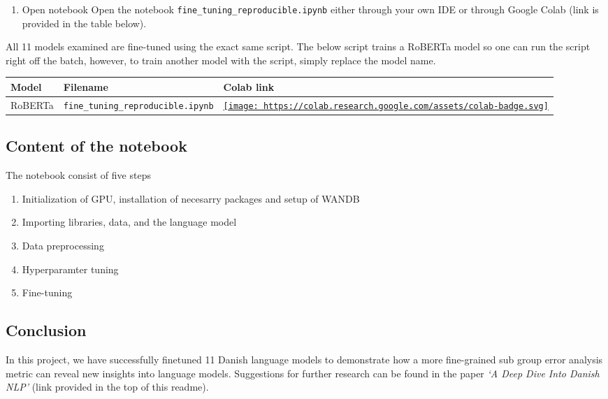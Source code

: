 \documentclass[
]{article}
\providecommand{\tightlist}{%
  \setlength{\itemsep}{0pt}\setlength{\parskip}{0pt}}
\begin{document}
\begin{enumerate}
\def\labelenumi{\arabic{enumi}.}
\setcounter{enumi}{1}
\tightlist
\item
  Open notebook Open the notebook
  \texttt{fine\_tuning\_reproducible.ipynb} either through your own IDE
  or through Google Colab (link is provided in the table below).
\end{enumerate}

All 11 models examined are fine-tuned using the exact same script. The
below script trains a RoBERTa model so one can run the script right off
the batch, however, to train another model with the script, simply
replace the model name.

\begin{longtable}[]{@{}lll@{}}
\toprule
Model & Filename & Colab link\tabularnewline
\midrule
\endhead
RoBERTa & \texttt{fine\_tuning\_reproducible.ipynb} &
\href{https://colab.research.google.com/drive/1I4GyXlebR7q1nbQ6uOR92cFyqCdDTgW2\#scrollTo=sR5zEsTidz5e}{\texttt{[image: https://colab.research.google.com/assets/colab-badge.svg]}}\tabularnewline
\bottomrule
\end{longtable}

\hypertarget{content-of-the-notebook}{%
\subsection{Content of the notebook}\label{content-of-the-notebook}}

The notebook consist of five steps

\begin{enumerate}
\def\labelenumi{\arabic{enumi}.}
\tightlist
\item
  Initialization of GPU, installation of necesarry packages and setup of
  WANDB
\item
  Importing libraries, data, and the language model
\item
  Data preprocessing
\item
  Hyperparamter tuning
\item
  Fine-tuning
\end{enumerate}

\hypertarget{conclusion-1}{%
\subsection{Conclusion}\label{conclusion-1}}

In this project, we have successfully finetuned 11 Danish language
models to demonstrate how a more fine-grained sub group error analysis
metric can reveal new insights into language models. Suggestions for
further research can be found in the paper \emph{`A Deep Dive Into
Danish NLP'} (link provided in the top of this readme).
\end{document}
